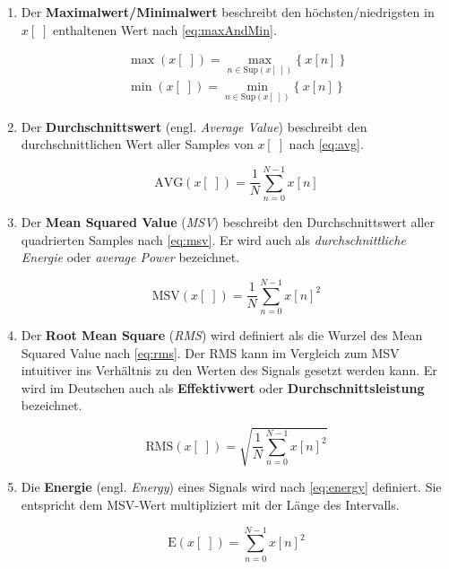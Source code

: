 \begin{enumerate}[leftmargin=*]
	
	\item Der \textbf{Maximalwert/Minimalwert} beschreibt den höchsten/niedrigsten in  $x[\;]$ enthaltenen Wert nach \autoref{eq:maxAndMin}.
	
	\begin{equation}
	\begin{gathered}
	\max(x[\;]) = \max\limits_{n \in \text{Sup}(x[\;]) }\{\ x[n]\ \} \\ 
	\min(x[\;])= \min\limits_{n \in \text{Sup}(x[\;])}\{\ x[n]\ \}
	\end{gathered}
	\label{eq:maxAndMin}
	\end{equation}
	
	
	\item Der \textbf{Durchschnittswert} (engl. \emph{Average Value}) beschreibt den durchschnittlichen Wert aller Samples von $x[\;]$ nach \autoref{eq:avg}.
	
	\begin{equation}
	\text{AVG}(x[\;]) = \frac{1}{N} \sum_{n = 0}^{N-1} x[n]
	\label{eq:avg}
	\end{equation}
	
	\item Der \textbf{Mean Squared Value} (\emph{MSV}) beschreibt den Durchschnittswert aller quadrierten Samples nach \autoref{eq:msv}. Er wird auch als \emph{durchschnittliche Energie} oder \emph{average Power} bezeichnet.
	
	\begin{equation}
	\text{MSV}(x[\;]) = \frac{1}{N} \sum_{n = 0}^{N-1} x[n]^2
	\label{eq:msv}
	\end{equation}
	
	\item Der \textbf{Root Mean Square} (\emph{RMS}) wird definiert als die Wurzel des Mean Squared Value nach \autoref{eq:rms}. Der RMS kann im Vergleich zum MSV intuitiver ins Verhältnis zu den Werten des Signals gesetzt werden kann. Er wird im Deutschen auch als \textbf{Effektivwert} oder \textbf{Durchschnittsleistung} bezeichnet.
	
	\begin{equation}
	\text{RMS}(x[\;]) = \sqrt{\frac{1}{N} \sum_{n = 0}^{N-1} x[n]^2}
	\label{eq:rms}
	\end{equation}
	
	\item Die \textbf{Energie} (engl. \emph{Energy}) eines Signals wird nach \autoref{eq:energy} definiert. Sie entspricht dem MSV-Wert multipliziert mit der Länge des Intervalls.\cite[S. 27-28]{dspMichigan}
	
	\begin{equation}
	\text{E}(x[\;]) = \sum_{n = 0}^{N-1} x[n]^2
	\label{eq:energy}
	\end{equation}
	
\end{enumerate}	

